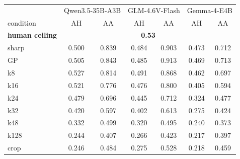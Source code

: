 \begin{tabular}{lcccccc}
\toprule
 & \multicolumn{2}{c}{Qwen3.5-35B-A3B} & \multicolumn{2}{c}{GLM-4.6V-Flash} & \multicolumn{2}{c}{Gemma-4-E4B} \\
condition & AH & AA & AH & AA & AH & AA \\
\midrule
\textbf{human ceiling} & \multicolumn{6}{c}{\textbf{0.53}} \\
sharp & 0.500 & 0.839 & 0.484 & 0.903 & 0.473 & 0.712 \\
GP & 0.505 & 0.843 & 0.485 & 0.913 & 0.469 & 0.713 \\
k8 & 0.527 & 0.814 & 0.491 & 0.868 & 0.462 & 0.697 \\
k16 & 0.521 & 0.776 & 0.476 & 0.800 & 0.405 & 0.594 \\
k24 & 0.479 & 0.696 & 0.445 & 0.712 & 0.324 & 0.477 \\
k32 & 0.420 & 0.597 & 0.402 & 0.613 & 0.275 & 0.424 \\
k48 & 0.332 & 0.499 & 0.320 & 0.495 & 0.240 & 0.373 \\
k128 & 0.244 & 0.407 & 0.266 & 0.423 & 0.217 & 0.397 \\
crop & 0.246 & 0.484 & 0.275 & 0.528 & 0.218 & 0.459 \\
\bottomrule
\end{tabular}
